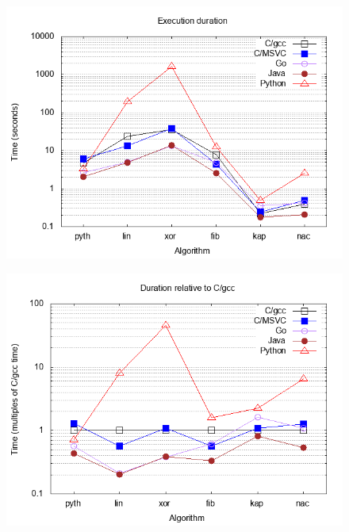 \documentclass[a4paper,11pt]{article}
\begin{document}
\begin{figure}[h]
\centering
\includegraphics[scale=0.75]{"v1/times.png"}
\end{figure}

\begin{figure}[h]
\centering
\includegraphics[scale=0.75]{"v1/normalised.png"}
\end{figure}
\end{document}
